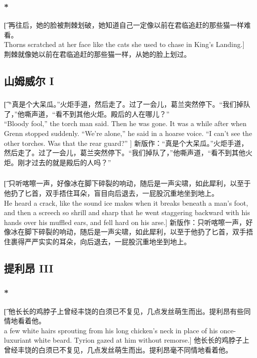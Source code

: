 \documentclass[12pt,a4paper]{article}
\begin{document}
\subsubsection{\color{red}*}\t[
	 再往后，她的脸被荆棘划破，她知道自己一定像以前在君临追赶的那些猫一样难看。\\
	 Thorns scratched at her face like the cats she used to chase in King's Landing.]
	 荆棘就像她以前在君临追赶的那些猫一样，从她的脸上划过。
	 
\subsection{山姆威尔 I}
\subsubsection{}\t[
	“真是个大呆瓜。”火炬手道，然后走了。过了一会儿，葛兰突然停下。“我们掉队了，”他嘶声道，“看不到其他火炬。殿后的人在哪儿？” \\
	“Bloody fool,” the torch man said. Then he was gone. It was a while after when Grenn stopped suddenly. “We're alone,” he said in a hoarse voice. “I can't see the other torches. Was that the rear guard?” ]
	新版作：“真是个大呆瓜。”火炬手道，然后走了。过了一会儿，葛兰突然停下。“我们掉队了，”他嘶声道，“看不到其他火炬。刚才过去的就是殿后的人吗？” 
	
\subsubsection{}\t[
	只听喀嚓一声，好像冰在脚下碎裂的响动，随后是一声尖啸，如此犀利，以至于他扔了匕首，双手捂住耳朵，盲目向后退去，一屁股沉重地坐到地上。\\
	He heard a crack, like the sound ice makes when it breaks beneath a man's foot, and then a screech so shrill and sharp that he went staggering backward with his hands over his muffled ears, and fell hard on his arse.]
	新版作：只听喀嚓一声，好像冰在脚下碎裂的响动，随后是一声尖啸，如此犀利，以至于他扔了匕首，双手捂住裹得严严实实的耳朵，向后退去，一屁股沉重地坐到地上。
	
\subsection{提利昂 III}
\subsubsection{\color{red}*}\t[
	他长长的鸡脖子上曾经丰饶的白须已不复见，几点发丝萌生而出。提利昂有些同情地看着他。\\
	a few white hairs sprouting from his long chicken's neck in place of his once-luxuriant white beard. Tyrion gazed at him without remorse.]
	他长长的鸡脖子上曾经丰饶的白须已不复见，几点发丝萌生而出。提利昂毫不同情地看着他。
\end{document}
